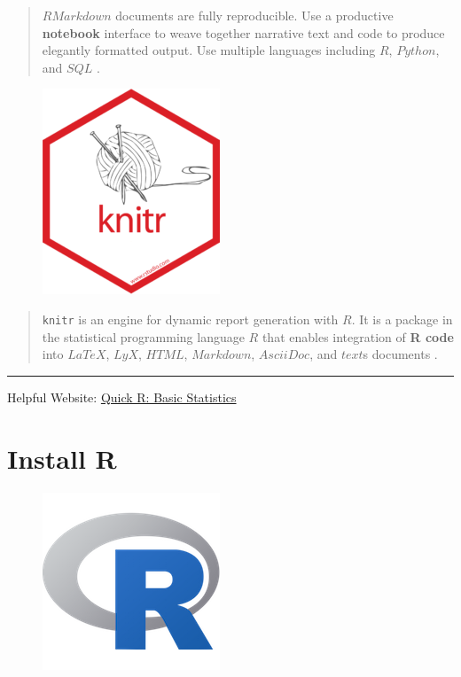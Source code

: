 \documentclass[]{book}
\begin{document}
\begin{quote}
\(R Markdown\) documents are fully reproducible. Use a productive
\textbf{notebook} interface to weave together narrative text and code to
produce elegantly formatted output. Use multiple languages including
\(R\), \(Python\), and \(SQL\) \citep{R-rmarkdown}.
\end{quote}

\begin{figure}
\centering
\includegraphics{images/hex/knitr-200x232.png}
\caption{}
\end{figure}

\begin{quote}
\texttt{knitr} is an engine for dynamic report generation with \(R\). It
is a package in the statistical programming language \(R\) that enables
integration of \textbf{R code} into \(LaTeX\), \(LyX\), \(HTML\),
\(Markdown\), \(AsciiDoc\), and \(text\)s documents \citep{R-knitr}.
\end{quote}

\begin{center}\rule{0.5\linewidth}{\linethickness}\end{center}

\begin{rmdtip}
Helpful Website:
\href{https://www.statmethods.net/stats/index.html}{Quick R: Basic
Statistics}
\end{rmdtip}

\chapter{Install R}\label{install-r}

\begin{figure}
\centering
\includegraphics{images/Rlogo_200.png}
\caption{}
\end{figure}
\end{document}
